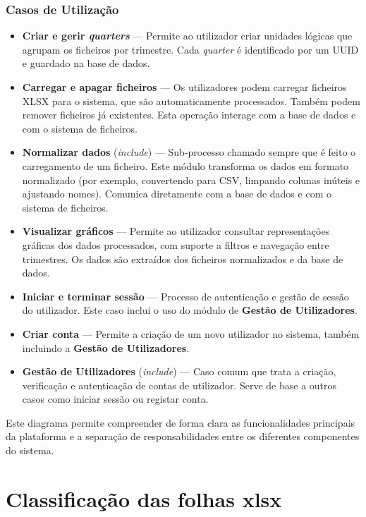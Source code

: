 \subsection*{Casos de Utilização}
\begin{itemize}
    \item \textbf{Criar e gerir \textit{quarters}} — Permite ao utilizador criar unidades lógicas que agrupam os ficheiros por trimestre. Cada \textit{quarter} é identificado por um UUID e guardado na base de dados.
    \item \textbf{Carregar e apagar ficheiros} — Os utilizadores podem carregar ficheiros XLSX para o sistema, que são automaticamente processados. Também podem remover ficheiros já existentes. Esta operação interage com a base de dados e com o sistema de ficheiros.
    \item \textbf{Normalizar dados} (\textit{include}) — Sub-processo chamado sempre que é feito o carregamento de um ficheiro. Este módulo transforma os dados em formato normalizado (por exemplo, convertendo para CSV, limpando colunas inúteis e ajustando nomes). Comunica diretamente com a base de dados e com o sistema de ficheiros.
    \item \textbf{Visualizar gráficos} — Permite ao utilizador consultar representações gráficas dos dados processados, com suporte a filtros e navegação entre trimestres. Os dados são extraídos dos ficheiros normalizados e da base de dados.
    \item \textbf{Iniciar e terminar sessão} — Processo de autenticação e gestão de sessão do utilizador. Este caso inclui o uso do módulo de \textbf{Gestão de Utilizadores}.
    \item \textbf{Criar conta} — Permite a criação de um novo utilizador no sistema, também incluindo a \textbf{Gestão de Utilizadores}.
    \item \textbf{Gestão de Utilizadores} (\textit{include}) — Caso comum que trata a criação, verificação e autenticação de contas de utilizador. Serve de base a outros casos como iniciar sessão ou registar conta.
\end{itemize}

Este diagrama permite compreender de forma clara as funcionalidades principais da plataforma e a separação de responsabilidades entre os diferentes componentes do sistema.

\chapter{Classificação das folhas \gls{xlsx}}


